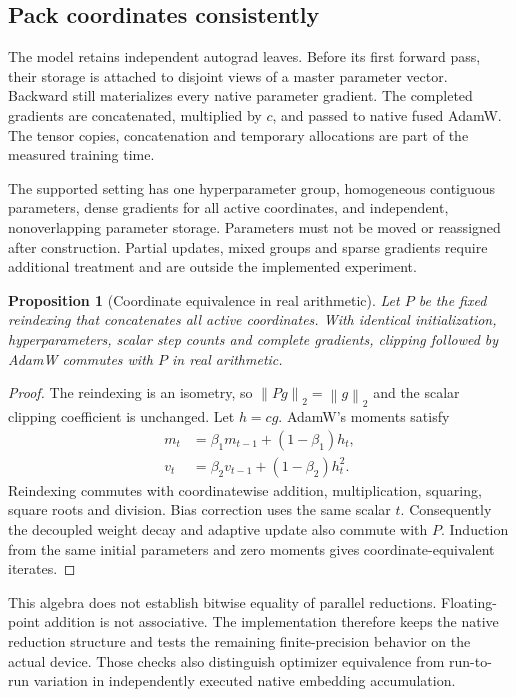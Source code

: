 \documentclass[11pt]{article}
\newtheorem{proposition}{Proposition}
\newcommand{\norm}[1]{\left\lVert #1\right\rVert_2}
\begin{document}
\subsection{Pack coordinates consistently}
The model retains independent autograd leaves. Before its first forward pass,
their storage is attached to disjoint views of a master parameter vector.
Backward still materializes every native parameter gradient. The completed
gradients are concatenated, multiplied by $c$, and passed to native fused
AdamW. The tensor copies, concatenation and temporary allocations are part of
the measured training time.

The supported setting has one hyperparameter group, homogeneous contiguous
parameters, dense gradients for all active coordinates, and independent,
nonoverlapping parameter storage. Parameters must not be moved or reassigned
after construction. Partial updates, mixed groups and sparse gradients require
additional treatment and are outside the implemented experiment.

\begin{proposition}[Coordinate equivalence in real arithmetic]
Let $P$ be the fixed reindexing that concatenates all active coordinates.
With identical initialization, hyperparameters, scalar step counts and complete
gradients, clipping followed by AdamW commutes with $P$ in real arithmetic.
\end{proposition}
\begin{proof}
The reindexing is an isometry, so $\norm{Pg}=\norm{g}$ and the scalar clipping
coefficient is unchanged. Let $h=cg$. AdamW's moments satisfy
\begin{align}
 m_t&=\beta_1m_{t-1}+(1-\beta_1)h_t,\\
 v_t&=\beta_2v_{t-1}+(1-\beta_2)h_t^2.
\end{align}
Reindexing commutes with coordinatewise addition, multiplication, squaring,
square roots and division. Bias correction uses the same scalar $t$.
Consequently the decoupled weight decay and adaptive update also commute with
$P$. Induction from the same initial parameters and zero moments gives
coordinate-equivalent iterates.
\end{proof}

This algebra does not establish bitwise equality of parallel reductions.
Floating-point addition is not associative. The implementation therefore keeps
the native reduction structure and tests the remaining finite-precision
behavior on the actual device. Those checks also distinguish optimizer
equivalence from run-to-run variation in independently executed native
embedding accumulation.
\end{document}
